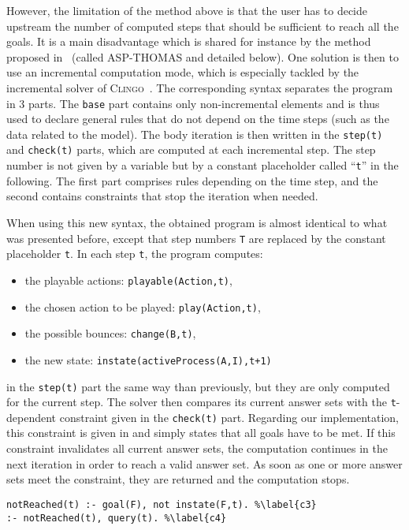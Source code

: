 However, the limitation of the method above is that the user has to decide upstream
the number of computed steps that should be sufficient to reach all the goals.
It is a main disadvantage which is shared for instance by the method proposed in~\cite{roccaasp} (called \textsc{ASP-THOMAS} and detailed below).
One solution is then to use an incremental computation mode,
which is especially tackled by the incremental solver of \textsc{Clingo}~\cite{gebser2008user}.
The corresponding syntax separates the program in 3 parts.
The \texttt{base} part contains only non-incremental elements
and is thus used to declare general rules
that do not depend on the time steps (such as the data related to the model).
The body iteration is then written in the
\texttt{step(t)} and \texttt{check(t)} parts,
which are computed at each incremental step. The step number is not given by a variable but by a constant placeholder called ``\texttt{t}'' in the following.
The first part comprises rules depending on the time step,
and the second contains constraints that stop the iteration when needed.

When using this new syntax, the obtained program is almost identical
to what was presented before,
except that step numbers \texttt{T}
are replaced by the constant placeholder \texttt{t}.
In each step \texttt{t}, the program computes:
\begin{itemize}\renewcommand{\labelitemi}{--}
  \item the playable actions: \texttt{playable(Action,t)},
  \item the chosen action to be played: \texttt{play(Action,t)},
  \item the possible bounces: \texttt{change(B,t)},
  \item the new state: \texttt{instate(activeProcess(A,I),t+1)}
\end{itemize}
in the \texttt{step(t)} part
the same way than previously,
but they are only computed for the current step.
The solver then compares its current answer sets with
the \texttt{t}-dependent constraint given in the \texttt{check(t)} part.
Regarding our implementation, this constraint is given in 
and simply states that all goals have to be met.
If this constraint invalidates all current answer sets,
the computation continues in the next iteration in order to reach a valid answer set.
As soon as one or more answer sets meet the constraint,
they are returned and the computation stops.
\begin{lstlisting}
notReached(t) :- goal(F), not instate(F,t). %\label{c3}
:- notReached(t), query(t). %\label{c4}
\end{lstlisting}



